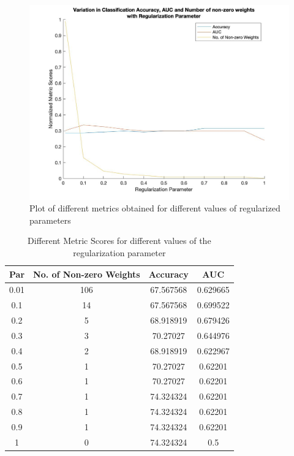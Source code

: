 \documentclass[11pt]{article}
\begin{document}
\begin{figure}[H]
	\centering
	\begin{adjustbox}{width=0.65\paperwidth}
			\includegraphics{Codes/Results/L1 Logistic Train/Metric_Variance} 
	\end{adjustbox}
	\caption{Plot of different metrics obtained for different values of regularized parameters}
	\label{fig:metric_scores}
\end{figure}


\begin{table}[H]
	\centering
	\begin{tabular}{|c|c|c|c|}
		\hline
		\textbf{Par} & \textbf{No. of Non-zero Weights} & \textbf{Accuracy} & \textbf{AUC} \\ \hline
		0.01 & 106 & 67.567568 & 0.629665 \\ \hline
		0.1 & 14 & 67.567568 & 0.699522 \\ \hline
		0.2 & 5 & 68.918919 & 0.679426 \\ \hline
		0.3 & 3 & 70.27027 & 0.644976 \\ \hline
		0.4 & 2 & 68.918919 & 0.622967 \\ \hline
		0.5 & 1 & 70.27027 & 0.62201 \\ \hline
		0.6 & 1 & 70.27027 & 0.62201 \\ \hline
		0.7 & 1 & 74.324324 & 0.62201 \\ \hline
		0.8 & 1 & 74.324324 & 0.62201 \\ \hline
		0.9 & 1 & 74.324324 & 0.62201 \\ \hline
		1 & 0 & 74.324324 & 0.5 \\ \hline
	\end{tabular}
	\caption{Different Metric Scores for different values of the regularization parameter}
	\label{tab:metric_scores}
\end{table}
\end{document}
